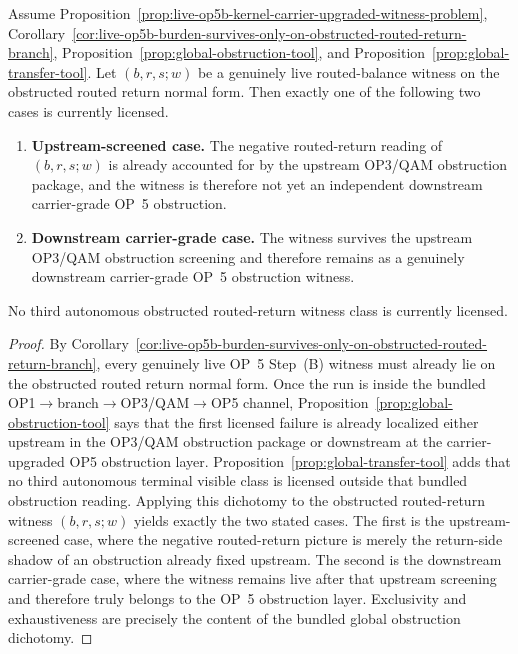 \begin{proposition}
\label{prop:remaining-obstructed-routed-return-burden-is-upstream-downstream-split}
Assume Proposition~\ref{prop:live-op5b-kernel-carrier-upgraded-witness-problem}, Corollary~\ref{cor:live-op5b-burden-survives-only-on-obstructed-routed-return-branch}, Proposition~\ref{prop:global-obstruction-tool}, and Proposition~\ref{prop:global-transfer-tool}. Let $(b,r,s;w)$ be a genuinely live routed-balance witness on the obstructed routed return normal form. Then exactly one of the following two cases is currently licensed.
\begin{enumerate}[leftmargin=2em,label=(\roman*)]
\item \textbf{Upstream-screened case.} The negative routed-return reading of $(b,r,s;w)$ is already accounted for by the upstream OP3/QAM obstruction package, and the witness is therefore not yet an independent downstream carrier-grade OP~5 obstruction.
\item \textbf{Downstream carrier-grade case.} The witness survives the upstream OP3/QAM obstruction screening and therefore remains as a genuinely downstream carrier-grade OP~5 obstruction witness.
\end{enumerate}
No third autonomous obstructed routed-return witness class is currently licensed.
\end{proposition}

\begin{proof}
By Corollary~\ref{cor:live-op5b-burden-survives-only-on-obstructed-routed-return-branch}, every genuinely live OP~5 Step~(B) witness must already lie on the obstructed routed return normal form. Once the run is inside the bundled OP1$\to$branch$\to$OP3/QAM$\to$OP5 channel, Proposition~\ref{prop:global-obstruction-tool} says that the first licensed failure is already localized either upstream in the OP3/QAM obstruction package or downstream at the carrier-upgraded OP5 obstruction layer. Proposition~\ref{prop:global-transfer-tool} adds that no third autonomous terminal visible class is licensed outside that bundled obstruction reading. Applying this dichotomy to the obstructed routed-return witness $(b,r,s;w)$ yields exactly the two stated cases. The first is the upstream-screened case, where the negative routed-return picture is merely the return-side shadow of an obstruction already fixed upstream. The second is the downstream carrier-grade case, where the witness remains live after that upstream screening and therefore truly belongs to the OP~5 obstruction layer. Exclusivity and exhaustiveness are precisely the content of the bundled global obstruction dichotomy.
\end{proof}

